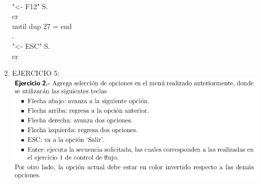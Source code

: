 \documentclass[conference]{IEEEtran}
\begin{document}
\begin{enumerate}
\begin{center}
\\ "<- F12" S. \\ cr \\ until dup 27 = end \\ . \\ "<- ESC" S. \\ cr \\ 
		\end{center}
\newpage
		\item  EJERCICIO 5:\\
	\includegraphics{e5} \\
	\begin{center}

\end{center}
\end{enumerate}
\end{document}
